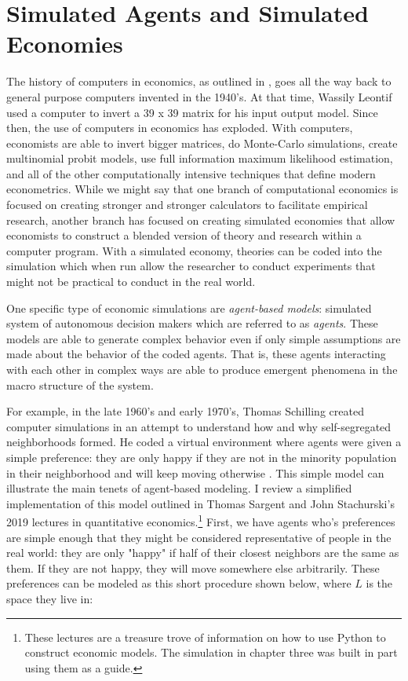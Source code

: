 \documentclass[12pt,twoside]{reedthesis}
\begin{document}
	
\section{Simulated Agents and Simulated Economies}
The history of computers in economics, as outlined in \citet{Backhouse2016}, goes all the way back to general purpose computers invented in the 1940's. At that time, Wassily Leontif used a computer to invert a 39 x 39 matrix for his input output model. Since then, the use of computers in economics has exploded. With computers, economists are able to invert bigger matrices, do Monte-Carlo simulations, create multinomial probit models, use full information maximum likelihood estimation, and all of the other computationally intensive techniques that define modern econometrics. While we might say that one branch of computational economics is focused on creating stronger and stronger calculators to facilitate empirical research, another branch has focused on creating simulated economies that allow economists to construct a blended version of theory and research within a computer program. With a simulated economy, theories can be coded into the simulation which when run allow the researcher to conduct experiments that might not be practical to conduct in the real world. 

One specific type of economic simulations are {\em agent-based models}: simulated system of autonomous decision makers which are referred to as {\em agents}. These models are able to generate complex behavior even if only simple assumptions are made about the behavior of the coded agents. That is, these agents interacting with each other in complex ways are able to produce emergent phenomena in the macro structure of the system.

For example, in the late 1960's and early 1970's, Thomas Schilling created computer simulations in an attempt to understand how and why self-segregated neighborhoods formed. He coded a virtual environment where agents were given a simple preference: they are only happy if they are not in the minority population in their neighborhood and will keep moving otherwise \citep{Schelling1969}. This simple model can illustrate the main tenets of agent-based modeling. I review a simplified implementation of this model outlined in Thomas Sargent and John Stachurski's 2019 lectures in quantitative economics.\footnote{These lectures are a treasure trove of information on how to use Python to construct economic models. The simulation in chapter three was built in part using them as a guide.} First, we have agents who's preferences are simple enough that they might be considered representative of people in the real world: they are only "happy" if half of their closest neighbors are the same as them. If they are not happy, they will move somewhere else arbitrarily. These preferences can be modeled as this short procedure shown below, where $L$ is the space they live in:
\end{document}
